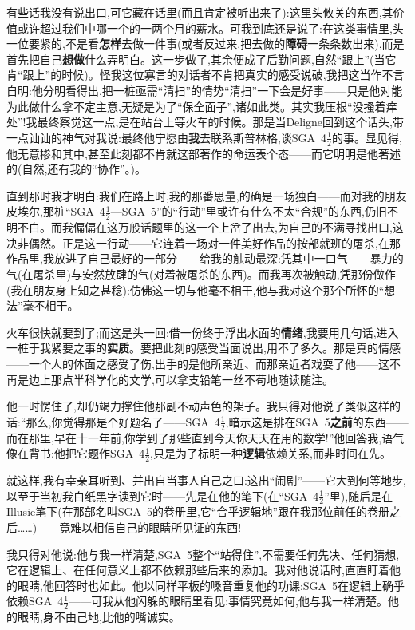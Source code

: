 有些话我没有说出口,可它藏在话里(而且肯定被听出来了):这里头攸关的东西,其价值或许超过我们中哪一个的一两个月的薪水。可我到底还是说了:在这类事情里,头一位要紧的,不是看\textbf{怎样}去做一件事(或者反过来,把去做的\textbf{障碍}一条条数出来),而是首先把自己\dmark{}\textbf{想做}什么弄明白。这一步做了,其余便成了后勤问题,自然“跟上”(当它肯“跟上”的时候)。怪我这位寡言的对话者不肯把真实的感受说破,我把这当作不言自明:他分明看得出,把一桩亟需“清扫”的情势“清扫”一下会是好事——只是他对能为此做什么拿不定主意,无疑是为了“保全面子”,诸如此类。其实我压根“没搔着痒处”!我最终察觉这一点,是在站台上等火车的时候。那是当Deligne回到这个话头,带一点讪讪的神气对我说:最终他宁愿由\textbf{我}去联系斯普林格,谈SGA~4$\frac{1}{2}$的事。显见得,他无意掺和其中,甚至此刻都不肯就这部著作的命运表个态——而它明明是他著述的(自然,还有我的“协作”。)。

直到那时我才明白:我们在路上时,我的那番思量,的确是一场独白——而对我的朋友皮埃尔,那桩“SGA~4$\frac{1}{2}$—SGA~5”的“行动”里或许有什么不太“合规”的东西,仍旧不明不白。而我偏偏在这万般话题里的这一个上岔了出去,为自己的不满寻找出口,这决非偶然。正是这一行动——它连着一场对一件美好作品的按部就班的屠杀,在那作品里,我放进了自己最好的一部分——给我的触动最深:凭其中一口气——暴力的气(在屠杀里)与安然放肆的气(对着被屠杀的东西)。而我再次被触动,凭那份做作(我在朋友身上知之甚稔):仿佛这一切与他毫不相干,他与我对这个那个所怀的“想法”毫不相干。

火车很快就要到了;而这是头一回:借一份终于浮出水面的\textbf{情绪},我要用几句话,进入一桩于我紧要之事的\textbf{实质}。要把此刻的感受当面说出,用不了多久。那是真的情感——一个人的体面之感受了伤,出手的是他所亲近、而那亲近者戏耍了他——这不再是边上那点半科学化的文学,可以拿支铅笔一丝不苟地随读随注。

\dmark{}他一时愣住了,却仍竭力撑住他那副不动声色的架子。我只得对他说了类似这样的话:“那么,你觉得那是个好题名了——SGA~4$\frac{1}{2}$,暗示这是排在SGA~5\textbf{之前}的东西——而在那里,早在十一年前,你学到了那些直到今天你天天在用的数学!”他回答我,语气像在背书:他把它题作SGA~4$\frac{1}{2}$,只是为了标明一种\textbf{逻辑}依赖关系,而非时间在先。

就这样,我有幸亲耳听到、并出自当事人自己之口:这出“闹剧”——它大到何等地步,以至于当初我白纸黑字读到它时——先是在他的笔下(在“SGA~4$\frac{1}{2}$”里),随后是在Illusie笔下(在那部名叫SGA~5的卷册里,它“合乎逻辑地”跟在我那位前任的卷册之后……)——竟难以相信自己的眼睛所见证的东西!

我只得对他说:他与我一样清楚,SGA~5整个“站得住”,不需要任何先决、任何猜想,它在逻辑上、在任何意义上都不依赖那些后来的添加。我对他说话时,直直盯着他的眼睛,他回答时也如此。他以同样平板的嗓音重复他的功课:SGA~5在逻辑上确乎依赖SGA~4$\frac{1}{2}$——可我从他闪躲的眼睛里看见:事情究竟如何,他与我一样清楚。他的眼睛,身不由己地,比他的嘴诚实。


